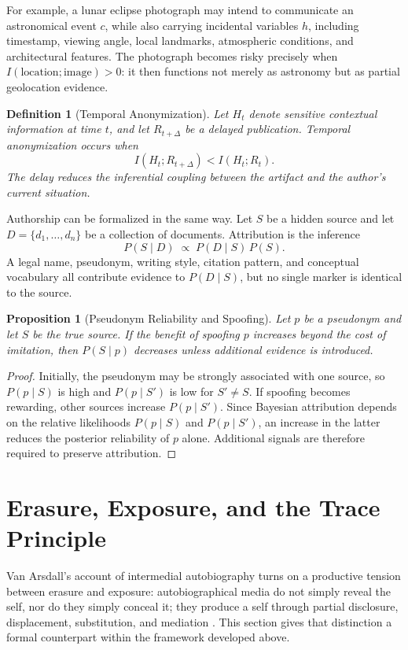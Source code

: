 \documentclass[11pt]{article}
\theoremstyle{plain}
\newtheorem{definition}{Definition}[section]
\newtheorem{proposition}{Proposition}[section]
\begin{document}
For example, a lunar eclipse photograph may intend to communicate an astronomical event $c$, while also carrying incidental variables $h$, including timestamp, viewing angle, local landmarks, atmospheric conditions, and architectural features. The photograph becomes risky precisely when $I(\text{location}; \text{image}) > 0$: it then functions not merely as astronomy but as partial geolocation evidence.

\begin{definition}[Temporal Anonymization]
Let $H_t$ denote sensitive contextual information at time $t$, and let $R_{t+\Delta}$ be a delayed publication. Temporal anonymization occurs when
\[
I(H_t; R_{t+\Delta}) < I(H_t; R_t).
\]
The delay reduces the inferential coupling between the artifact and the author's current situation.
\end{definition}

Authorship can be formalized in the same way. Let $S$ be a hidden source and let $D = \{d_1,\ldots,d_n\}$ be a collection of documents. Attribution is the inference
\[
P(S \mid D) \;\propto\; P(D \mid S)\,P(S).
\]
A legal name, pseudonym, writing style, citation pattern, and conceptual vocabulary all contribute evidence to $P(D\mid S)$, but no single marker is identical to the source.

\begin{proposition}[Pseudonym Reliability and Spoofing]
Let $p$ be a pseudonym and let $S$ be the true source. If the benefit of spoofing $p$ increases beyond the cost of imitation, then $P(S \mid p)$ decreases unless additional evidence is introduced.
\end{proposition}
\begin{proof}
Initially, the pseudonym may be strongly associated with one source, so $P(p\mid S)$ is high and $P(p\mid S')$ is low for $S' \neq S$. If spoofing becomes rewarding, other sources increase $P(p\mid S')$. Since Bayesian attribution depends on the relative likelihoods $P(p\mid S)$ and $P(p\mid S')$, an increase in the latter reduces the posterior reliability of $p$ alone. Additional signals are therefore required to preserve attribution.
\end{proof}

\section{Erasure, Exposure, and the Trace Principle}

Van Arsdall's account of intermedial autobiography turns on a productive tension between erasure and exposure: autobiographical media do not simply reveal the self, nor do they simply conceal it; they produce a self through partial disclosure, displacement, substitution, and mediation \cite{vanarsdall2015}. This section gives that distinction a formal counterpart within the framework developed above.
\end{document}
